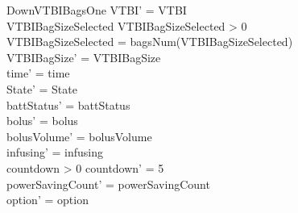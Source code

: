 \begin{schema}{DownVTBIBagsOne}
	VTBI' = VTBI\\
	VTBIBagSizeSelected  \land VTBIBagSizeSelected > 0\\
	VTBIBagSizeSelected = bagsNum(VTBIBagSizeSelected)\\
	VTBIBagSize' = VTBIBagSize\\
	time' = time\\ State' = State\\
	\pagebreak 
	battStatus' = battStatus\\
	bolus' = bolus\\
	bolusVolume' = bolusVolume\\
	infusing' = infusing\\
	countdown > 0 \land countdown' = 5\\
	powerSavingCount' = powerSavingCount\\ option' = option\\
\end{schema}

